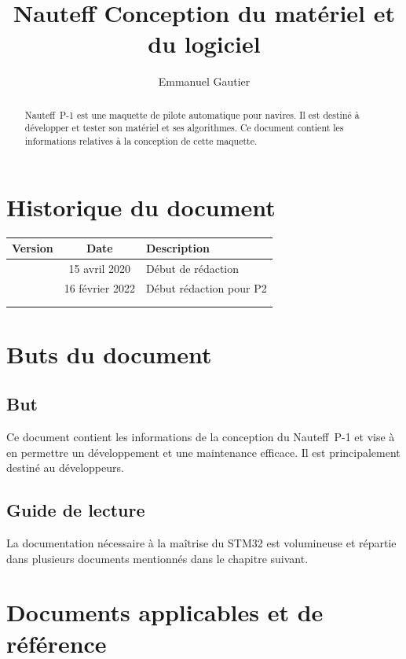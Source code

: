 \documentclass[a4paper,11pt]{report}
\title{Nauteff Conception du matériel et du logiciel}
\author{Emmanuel Gautier}
\begin{document}
\maketitle

\begin{abstract}
Nauteff~P-1 est une maquette de pilote automatique pour navires.
Il est destiné à développer et tester son matériel et ses algorithmes.
Ce document contient les informations relatives à la conception
de cette maquette.
\end{abstract}
\chapter*{Historique du document}
\begin{tabular}{|c|c|l|}
	\hline 
	 Version & Date & Description \\ 
	\hline 
	  & 15 avril 2020 &  Début de rédaction \\ 
	  & 16 février 2022 & Début rédaction pour P2 \\ 
	  &  &  \\ 
	  &  &  \\ 
	\hline 
\end{tabular}

\tableofcontents
\listoffigures

\chapter{Buts du document}
\section{But}
Ce document contient les informations de la conception du Nauteff~P-1 et vise à en permettre un développement et une maintenance efficace.
Il est principalement destiné au développeurs.

\section{Guide de lecture}

La documentation nécessaire à la maîtrise du STM32 est volumineuse et répartie
dans plusieurs documents mentionnés dans le chapitre suivant.

\chapter{Documents applicables et de référence}
\end{document}
